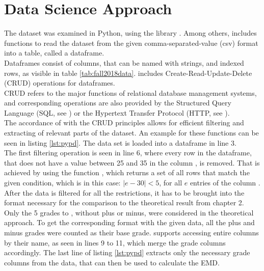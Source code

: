 \documentclass[12pt,letterpaper,oneside,openany]{book}
\begin{document}
\setcounter{chapter}{5}
\setcounter{table}{0}
\chapter{Data Science Approach}
The dataset was examined in Python, using the library . Among others,  includes functions to read the dataset from the given comma-separated-value (csv) format into a table, called a dataframe. \\
Dataframes  consist of  columns, that can be named with strings,  and indexed rows, as visible in table \ref{tab:fall2018data}.  includes Create-Read-Update-Delete (CRUD) operations for dataframes. \\
CRUD refers to the major functions of relational database management systems, and corresponding operations are also provided by the Structured Query Language (SQL, see \cite{date1993iso}) or the Hypertext Transfer Protocol (HTTP, see \cite{fielding1999hypertext}).\\
The accordance of  with the CRUD principles allows for efficient filtering and extracting of  relevant parts of the dataset. 
An example for these functions can be seen in listing \ref{lst:pypd}. The data set is loaded into a dataframe in line 3. \\
The first filtering operation is seen in line 6, where every row in the dataframe, that does not have a value between 25 and 35 in the column , is removed. That is achieved by using the function , which returns a set of all rows that match the given condition, which is in this case: $|e - 30| < 5$, for all $e$ entries of the column .
After the data is filtered for all the restrictions, it has to be brought into the format necessary for the comparison to the theoretical result from chapter 2. Only the 5 grades  to , without plus or minus, were considered in the theoretical approach. To get the corresponding format with the given data, all the plus and minus grades were counted as their base grade.  supports accessing entire columns by their name, as seen in lines 9 to 11, which merge the grade columns accordingly. 
The last line of listing \ref{lst:pypd} extracts only the necessary grade columns from the data, that can then be used to calculate the EMD.\\
\end{document}
